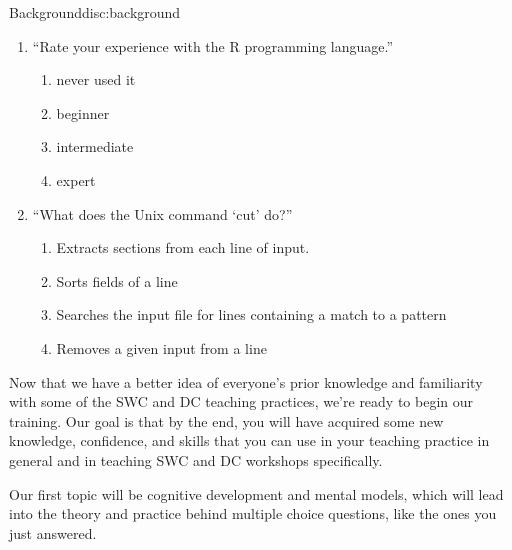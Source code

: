 \begin{discussion}{Background}{disc:background}
\begin{enumerate}
\begin{enumerate}
  \item
    ``Rate your experience with the R programming language.''
    \begin{enumerate}
    \item
      never used it
    \item
      beginner
    \item
      intermediate
    \item
      expert
    \end{enumerate}

  \item
    ``What does the Unix command `cut' do?''
    \begin{enumerate}
    \item
      Extracts sections from each line of input.
    \item
      Sorts fields of a line
    \item
      Searches the input file for lines containing a match to a pattern
    \item
      Removes a given input from a line
    \end{enumerate}
  \end{enumerate}
\end{enumerate}

\end{discussion}

Now that we have a better idea of everyone's prior knowledge and
familiarity with some of the SWC and DC teaching practices, we're ready
to begin our training. Our goal is that by the end, you will have
acquired some new knowledge, confidence, and skills that you can use in
your teaching practice in general and in teaching SWC and DC workshops
specifically.

Our first topic will be cognitive development and mental models, which
will lead into the theory and practice behind multiple choice questions,
like the ones you just answered.
